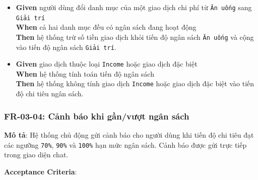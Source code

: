 \begin{itemize}
\item \textbf{Given} người dùng đổi danh mục của một giao dịch chi phí từ \texttt{Ăn uống} sang \texttt{Giải trí}  \\ \hspace*{1.5em}  \textbf{When} cả hai danh mục đều có ngân sách đang hoạt động  \\ \hspace*{1.5em}  \textbf{Then} hệ thống trừ số tiền giao dịch khỏi tiến độ ngân sách \texttt{Ăn uống} và cộng vào tiến độ ngân sách \texttt{Giải trí}.
\item \textbf{Given} giao dịch thuộc loại \texttt{Income} hoặc giao dịch đặc biệt  \\ \hspace*{1.5em}  \textbf{When} hệ thống tính toán tiến độ ngân sách  \\ \hspace*{1.5em}  \textbf{Then} hệ thống không tính giao dịch \texttt{Income} hoặc giao dịch đặc biệt vào tiến độ chi tiêu ngân sách.
\end{itemize}
\subsubsection{FR-03-04: Cảnh báo khi gần/vượt ngân sách}

\textbf{Mô tả}: Hệ thống chủ động gửi cảnh báo cho người dùng khi tiến độ chi tiêu đạt các ngưỡng \texttt{70\%}, \texttt{90\%} và \texttt{100\%} hạn mức ngân sách. Cảnh báo được gửi trực tiếp trong giao diện chat.



\textbf{Acceptance Criteria}:

